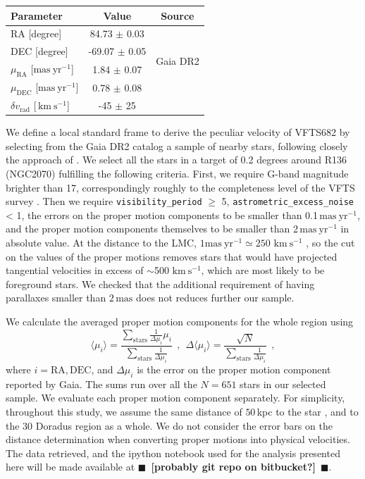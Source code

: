 \documentclass{aa}
\newcommand{\todo}[1]{{\large $\blacksquare$~\textbf{\color{red}[#1]}}~$\blacksquare$}
\newcommand{\kms}{{\,\mathrm{km\ s^{-1}}}}
\begin{document}
{\begin{table}[tbp]
  \begin{tabular}[htbp]{l|c|c}
    Parameter & Value & Source\\ \hline\hline
    RA \hfill[degree] &  \phantom{-}84.73 $\pm$  0.03 & \multirow{4}{*}{Gaia DR2}\\
    DEC \hfill [degree] & -69.07 $\pm$  0.05  & \\
    $\mu_\mathrm{RA}$  \hfill[$\mathrm{mas\ yr^{-1}}$] & \phantom{-0}1.84 $\pm$ 0.07 & \\
    $\mu_\mathrm{DEC}$  \hfill[$\mathrm{mas\ yr^{-1}}$] & \phantom{-0}0.78 $\pm$ 0.08& \\
    $\delta v_\mathrm{rad}$  \hfill[$\kms$] & \phantom{0}-45 $\pm$ 25 & \cite{bestenlehner:11}\\
    \hline
  \end{tabular}
  \label{tab:vfts682}
\end{table}

We define a local standard frame to derive the peculiar velocity
of VFTS682 by selecting from the Gaia DR2 catalog a sample of nearby
stars, following closely the approach of \cite{lennon:18}.
We select all the stars in a target of 0.2 degrees around R136
(NGC2070) fulfilling the following criteria. First, we require G-band
magnitude brighter than 17, correspondingly roughly to the
completeness level of the VFTS survey \citep[here we implicitly assume
G$\sim$V,][]{evans:11}. Then we require \texttt{visibility\_period} $\geq$ 5,
\texttt{astrometric\_excess\_noise} < 1, the errors on the proper
motion components to be smaller than 0.1\,$\mathrm{mas\ yr^{-1}}$,
and the proper motion components themselves to be smaller than
2\,$\mathrm{mas\ yr^{-1}}$ in absolute value. At the distance to the
LMC, $1\mathrm{mas\ yr^{-1}}\simeq250\,\kms$ \citep[e.g.,][]{lennon:18}, so the cut on the values
of the proper motions removes stars that would have projected
tangential velocities in excess of $\sim$500\,$\kms$, which are most
likely to be foreground stars. We checked that the additional
requirement of having parallaxes smaller than $2\,\mathrm{mas}$ does
not reduces further our sample. 

We calculate the averaged proper motion components for the whole
region using 
\begin{equation}
  \label{eq:mean}
  \langle \mu_i\rangle = \frac{\sum_\mathrm{stars}\frac{1}{\Delta
      \mu_i}\mu_i}{\sum_\mathrm{stars} \frac{1}{\Delta \mu_i}} \ \ , \
  \ \Delta \langle \mu_i\rangle = \frac{\sqrt{N}}{\sum_\mathrm{stars}
    \frac{1}{\Delta \mu_i}} \ \ ,
\end{equation}
where $i = \mathrm{RA}, \mathrm{DEC}$, and $\Delta \mu_i$ is the error
on the proper motion component reported by Gaia. The sums run over
all the $N=651$ stars in our selected sample. We evaluate each proper motion
component separately. For simplicity, throughout this study, we assume the same
distance of $50$\,kpc to the star \citep[][]{lebouteiller:08}, and to
the 30 Doradus region as a whole. We do not consider the error bars on
the distance determination when converting proper motions into
physical velocities. The data retrieved, and the ipython notebook used for the analysis
presented here will be made available at \todo{probably git repo on bitbucket?}. 

}
\end{document}
